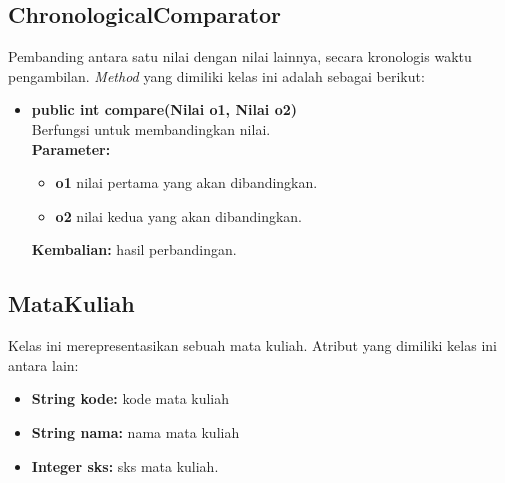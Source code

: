 \subsection{ChronologicalComparator}
Pembanding antara satu nilai dengan nilai lainnya, secara kronologis waktu pengambilan. \textit{Method} yang dimiliki kelas ini adalah sebagai berikut:

\begin{itemize}
	\item \textbf{public int compare(Nilai o1, Nilai o2) } \\
	Berfungsi untuk membandingkan nilai. \\
	\textbf{Parameter:}
	\begin{itemize}
		\item \textbf{o1} nilai pertama yang akan dibandingkan.
		\item \textbf{o2} nilai kedua yang akan dibandingkan.
	\end{itemize}
	\textbf{Kembalian:} hasil perbandingan.
\end{itemize}


\subsection{MataKuliah}
Kelas ini merepresentasikan sebuah mata kuliah. Atribut yang dimiliki kelas ini antara lain:
\begin{itemize}
	\item \textbf{String kode:} kode mata kuliah
	\item \textbf{String nama:} nama mata kuliah
	\item \textbf{Integer sks:} sks mata kuliah.
\end{itemize}

